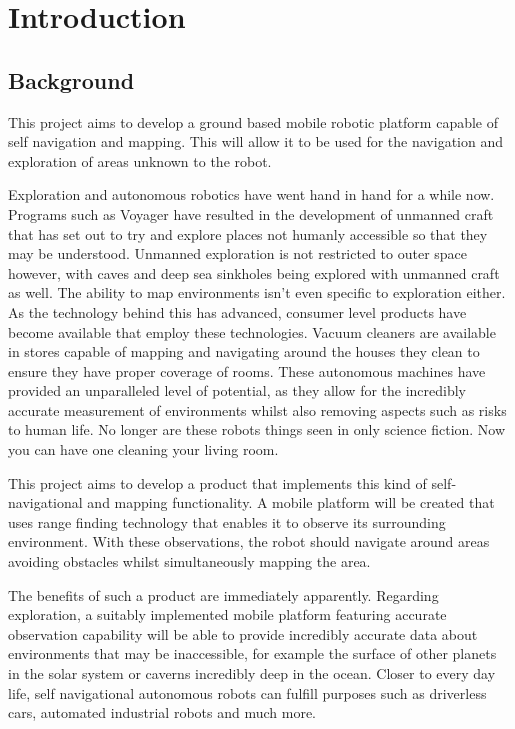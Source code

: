 \chapter{Introduction}\label{introduction}
	\section{Background}
	This project aims to develop a ground based mobile robotic platform capable of self navigation and mapping. This will allow it to be used for the navigation and exploration of areas unknown to the robot.
	
	Exploration and autonomous robotics have went hand in hand for a while now. Programs such as Voyager have resulted in the development of unmanned craft that has set out to try and explore places not humanly accessible so that they may be understood. Unmanned exploration is not restricted to outer space however, with caves\citep{mcfarlane2013integrated} and deep sea sinkholes\citep{carnegie2007sinkhole} being explored with unmanned craft as well. The ability to map environments isn't even specific to exploration either. As the technology behind this has advanced, consumer level products have become available that employ these technologies. Vacuum cleaners are available in stores capable of mapping and navigating around the houses they clean to ensure they have proper coverage of rooms. These autonomous machines have provided an unparalleled level of potential, as they allow for the incredibly accurate measurement of environments whilst also removing aspects such as risks to human life. No longer are these robots things seen in only science fiction. Now you can have one cleaning your living room.
	
	This project aims to develop a product that implements this kind of self-navigational and mapping functionality. A mobile platform will be created that uses range finding technology that enables it to observe its surrounding environment. With these observations, the robot should navigate around areas avoiding obstacles whilst simultaneously mapping the area.
	
	The benefits of such a product are immediately apparently. Regarding exploration, a suitably implemented mobile platform featuring accurate observation capability will be able to provide incredibly accurate data about environments that may be inaccessible, for example the surface of other planets in the solar system or caverns incredibly deep in the ocean. Closer to every day life, self navigational autonomous robots can fulfill purposes such as driverless cars, automated industrial robots and much more.
	
